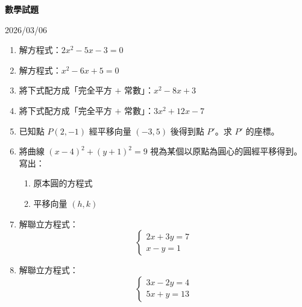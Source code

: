 \documentclass[a4paper,12pt]{article}
\newcommand{\workspace}{\vfill}
\newcommand{\examdate}{2026/03/06}
\begin{document}
\begin{center}
{\Large\bfseries 數學試題}
\end{center}

\begin{flushright}
\examdate
\end{flushright}

\vspace{1em}

\begin{enumerate}[label=\textbf{\arabic*.}, leftmargin=2em, itemsep=0pt]

\item 解方程式：$2x^2 - 5x - 3 = 0$
\workspace

\item 解方程式：$x^2 - 6x + 5 = 0$
\workspace

\item 將下式配方成「完全平方 $+$ 常數」：$x^2 - 8x + 3$
\workspace

\newpage

\item 將下式配方成「完全平方 $+$ 常數」：$3x^2 + 12x - 7$
\workspace

\item 已知點 $P(2,-1)$ 經平移向量 $(-3,5)$ 後得到點 $P'$。求 $P'$ 的座標。
\workspace

\item 將曲線 $(x-4)^2 + (y+1)^2 = 9$ 視為某個以原點為圓心的圓經平移得到。寫出：

\begin{enumerate}[label=(\arabic*)]
\item 原本圓的方程式
\item 平移向量 $(h,k)$
\end{enumerate}
\workspace

\newpage

\item 解聯立方程式：
\[
\begin{cases}
2x + 3y = 7 \\
x - y = 1
\end{cases}
\]
\workspace

\item 解聯立方程式：
\[
\begin{cases}
3x - 2y = 4 \\
5x + y = 13
\end{cases}
\]
\workspace

\end{enumerate}
\end{document}
